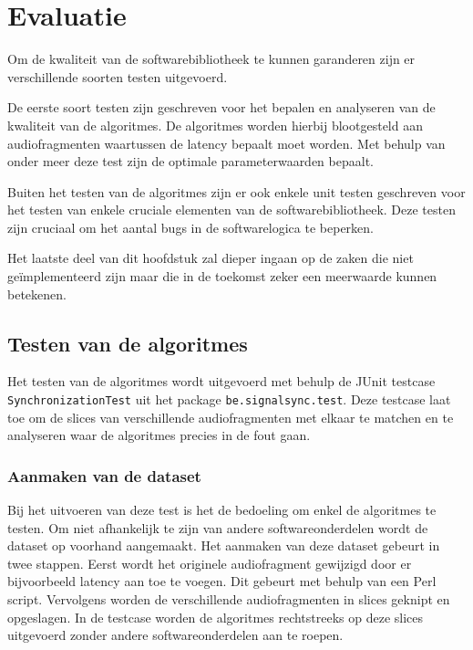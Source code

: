 \chapter{Evaluatie}
\label{evaluatie}

Om de kwaliteit van de softwarebibliotheek te kunnen garanderen zijn er verschillende soorten testen uitgevoerd. 

De eerste soort testen zijn geschreven voor het bepalen en analyseren van de kwaliteit van de algoritmes. De algoritmes worden hierbij blootgesteld aan audiofragmenten waartussen de latency bepaalt moet worden. Met behulp van onder meer deze test zijn de optimale parameterwaarden bepaalt.

Buiten het testen van de algoritmes zijn er ook enkele unit testen geschreven voor het testen van enkele cruciale elementen van de softwarebibliotheek. Deze testen zijn cruciaal om het aantal bugs in de softwarelogica te beperken.

Het laatste deel van dit hoofdstuk zal dieper ingaan op de zaken die niet geïmplementeerd zijn maar die in de toekomst zeker een meerwaarde kunnen betekenen.

\section{Testen van de algoritmes}

Het testen van de algoritmes wordt uitgevoerd met behulp de JUnit testcase \texttt{SynchronizationTest} uit het package \texttt{be.signalsync.test}. Deze testcase laat toe om de slices van verschillende audiofragmenten met elkaar te matchen en te analyseren waar de algoritmes precies in de fout gaan.

\subsection{Aanmaken van de dataset}

Bij het uitvoeren van deze test is het de bedoeling om enkel de algoritmes te testen. Om niet afhankelijk te zijn van andere softwareonderdelen wordt de dataset op voorhand aangemaakt. Het aanmaken van deze dataset gebeurt in twee stappen. Eerst wordt het originele audiofragment gewijzigd door er bijvoorbeeld latency aan toe te voegen. Dit gebeurt met behulp van een Perl script. Vervolgens worden de verschillende audiofragmenten in slices geknipt en opgeslagen. In de testcase worden de algoritmes rechtstreeks op deze slices uitgevoerd zonder andere softwareonderdelen aan te roepen.

